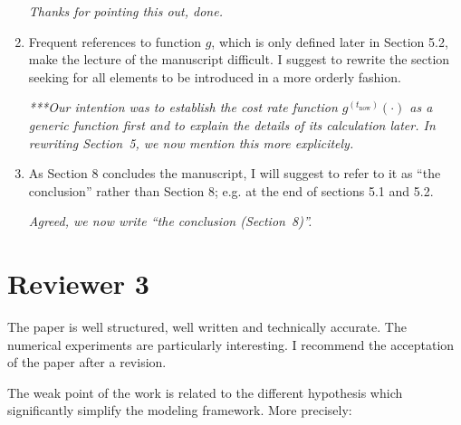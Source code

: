 \documentclass[authoryear]{elsarticle}
\def\tnow{t_\text{now}}
\begin{document}
\begin{enumerate}
\smallskip

\emph{Thanks for pointing this out, done.}

\item Frequent references to function $g$, which is only defined later in Section 5.2, make the lecture of the manuscript difficult. I suggest to rewrite the section seeking for all elements to be introduced in a more orderly fashion.

\smallskip

\emph{***Our intention was to establish the cost rate function $g^{(\tnow)}(\cdot)$ as a generic function first
and to explain the details of its calculation later.
In rewriting Section~5, we now mention this more explicitely.}

\item As Section 8 concludes the manuscript, I will suggest to refer to it as “the conclusion” rather than Section 8; e.g. at the end of sections 5.1 and 5.2.

\smallskip

\emph{Agreed, we now write ``the conclusion (Section~8)''.}
\end{enumerate}


\section*{Reviewer 3}

The paper is well structured, well written and technically accurate. The numerical experiments are particularly interesting. I recommend the acceptation of the paper after a revision. 

The weak point of the work is related to the different hypothesis which significantly simplify the modeling framework. More precisely:
\end{document}

